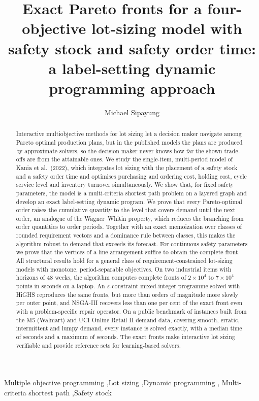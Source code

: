 \documentclass[preprint,12pt,authoryear]{elsarticle}
\begin{document}
\begin{frontmatter}

\title{Exact Pareto fronts for a four-objective lot-sizing model with safety stock and
safety order time: a label-setting dynamic programming approach}

\author[unimed]{Michael Sipayung}

\begin{abstract}
Interactive multiobjective methods for lot sizing let a decision maker navigate among
Pareto optimal production plans, but in the published models the plans are produced by
approximate solvers, so the decision maker never knows how far the shown trade-offs are
from the attainable ones. We study the single-item, multi-period model of Kania et al.\
(2022), which integrates lot sizing with the placement of a safety stock and a safety
order time and optimises purchasing and ordering cost, holding cost, cycle service level
and inventory turnover simultaneously. We show that, for fixed safety parameters, the
model is a multi-criteria shortest path problem on a layered graph and develop an exact
label-setting dynamic program. We prove that every Pareto-optimal order raises the
cumulative quantity to the level that covers demand until the next order, an analogue of
the Wagner--Whitin property, which reduces the branching from order quantities to order
periods. Together with an exact memoization over classes of rounded requirement vectors
and a dominance rule between classes, this makes the algorithm robust to demand that
exceeds its forecast. For continuous safety parameters we prove
that the vertices of a line arrangement suffice to obtain the complete front. All structural
results hold for a general class of requirement-constrained lot-sizing models with
monotone, period-separable objectives. On two
industrial items with horizons of 48 weeks, the algorithm computes complete fronts of
$2\times10^4$ to $7\times10^4$ points in seconds on a laptop. An $\varepsilon$-constraint
mixed-integer programme solved with HiGHS reproduces the same fronts, but more than
\EfiveOrders{} orders of magnitude more slowly per outer point, and NSGA-III recovers less than one per cent of the exact front
even with a problem-specific repair operator. On a public benchmark of \EsixInst{}
instances built from the M5 (Walmart) and UCI Online Retail II demand data, covering
smooth, erratic, intermittent and lumpy demand, every instance is solved exactly, with a
median time of \EsixMedTime{} seconds and a maximum of \EsixMaxTime{} seconds. The exact fronts make interactive lot sizing
verifiable and provide reference sets for learning-based solvers.
\end{abstract}

\begin{keyword}
Multiple objective programming \sep Lot sizing \sep Dynamic programming \sep
Multi-criteria shortest path \sep Safety stock
\end{keyword}
\end{frontmatter}
\end{document}
